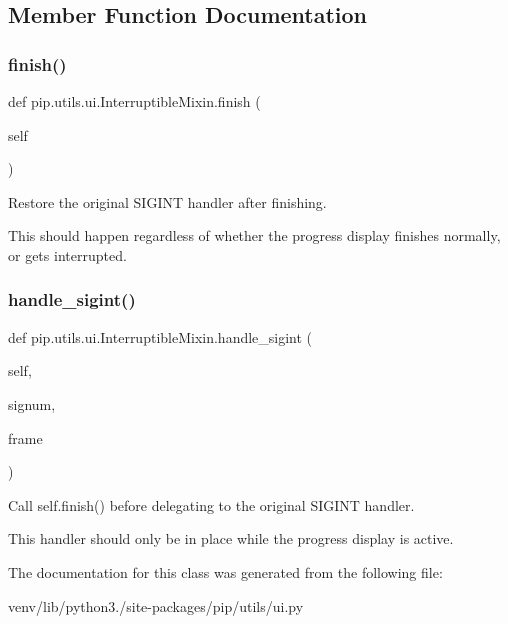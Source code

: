 \subsection{Member Function Documentation}
\mbox{\label{classpip_1_1utils_1_1ui_1_1_interruptible_mixin_a84fd71988f3ecafdf36194897266f44b}} 
\subsubsection{\texorpdfstring{finish()}{finish()}}
{\footnotesize\ttfamily def pip.\+utils.\+ui.\+Interruptible\+Mixin.\+finish (\begin{DoxyParamCaption}\item[{}]{self }\end{DoxyParamCaption})}

\begin{DoxyVerb}Restore the original SIGINT handler after finishing.

This should happen regardless of whether the progress display finishes
normally, or gets interrupted.
\end{DoxyVerb}
 \mbox{\label{classpip_1_1utils_1_1ui_1_1_interruptible_mixin_a7a4ee72f595de6a34cb077d829218874}} 
\subsubsection{\texorpdfstring{handle\+\_\+sigint()}{handle\_sigint()}}
{\footnotesize\ttfamily def pip.\+utils.\+ui.\+Interruptible\+Mixin.\+handle\+\_\+sigint (\begin{DoxyParamCaption}\item[{}]{self,  }\item[{}]{signum,  }\item[{}]{frame }\end{DoxyParamCaption})}

\begin{DoxyVerb}Call self.finish() before delegating to the original SIGINT handler.

This handler should only be in place while the progress display is
active.
\end{DoxyVerb}
 

The documentation for this class was generated from the following file\+:\begin{DoxyCompactItemize}
\item 
venv/lib/python3./site-\/packages/pip/utils/ui.\+py\end{DoxyCompactItemize}
